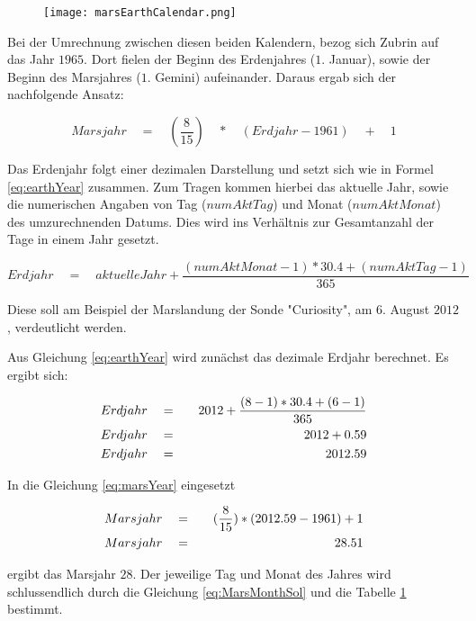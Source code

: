 \begin{figure}[H]
	\centering
	\texttt{[image: marsEarthCalendar.png]}
	\label{fig:marsEarthCalendar}
\end{figure}

Bei der Umrechnung zwischen diesen beiden Kalendern, bezog sich Zubrin auf das
Jahr $1965$. Dort fielen der Beginn des Erdenjahres ($1.$ Januar), sowie der
Beginn des Marsjahres ($1.$ Gemini) aufeinander. Daraus ergab sich der
nachfolgende Ansatz:

\begin{equation}
	Marsjahr \quad = \quad (\frac{8}{15}) \quad * \quad (Erdjahr - 1961) \quad + \quad 1
	\label{eq:marsYear}
\end{equation}

Das Erdenjahr folgt einer dezimalen Darstellung und setzt sich wie in Formel
\ref{eq:earthYear} zusammen. Zum Tragen kommen hierbei das aktuelle Jahr, sowie
die numerischen Angaben von Tag ($numAktTag$) und Monat ($numAktMonat$) des
umzurechnenden Datums. Dies wird ins Verhältnis zur Gesamtanzahl der Tage in
einem Jahr gesetzt.

\begin{equation}
	Erdjahr \quad = \quad aktuelleJahr + \frac{ (numAktMonat - 1) * 30.4 + (numAktTag - 1) }{365}
	\label{eq:earthYear}
\end{equation}

Diese soll am Beispiel der Marslandung der Sonde "Curiosity", am $6.$ August
$2012$, verdeutlicht werden.

Aus Gleichung \ref{eq:earthYear} wird zunächst das dezimale Erdjahr berechnet.
Es ergibt sich:

\begin{eqnarray}
	Erdjahr \quad & = & \quad 2012 + \frac{ (8-1) * 30.4 + (6-1) }{365} \notag\\
	Erdjahr \quad & = & \quad 2012 + 0.59 \notag\\
	Erdjahr \quad & = & \quad 2012.59
\end{eqnarray}

In die Gleichung \ref{eq:marsYear} eingesetzt

\begin{eqnarray}
	Marsjahr \quad & = & \quad (\frac{8}{15}) * (2012.59 - 1961) + 1 \notag\\
	Marsjahr \quad & = & \quad 28.51
\end{eqnarray}

ergibt das Marsjahr $28$. Der jeweilige Tag und Monat des Jahres wird
schlussendlich durch die Gleichung \ref{eq:MarsMonthSol} und die Tabelle
\ref{fig:marsEarthCalendar} bestimmt.

